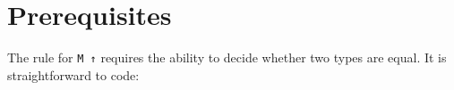 \hypertarget{prerequisites}{%
\section{Prerequisites}\label{prerequisites}}

The rule for \texttt{M\ ↑} requires the ability to decide whether two
types are equal. It is straightforward to code:

\begin{fence}
\begin{code}%
\>[0]\AgdaSpace{}%
\AgdaSymbol{:}\AgdaSpace{}%
\AgdaSymbol{(}\AgdaSpace{}%
\AgdaSpace{}%
\AgdaSymbol{:}\AgdaSpace{}%
\AgdaSymbol{)}\AgdaSpace{}%
\AgdaSpace{}%
\AgdaSpace{}%
\AgdaSymbol{(}\AgdaSpace{}%
\AgdaSpace{}%
\AgdaSymbol{)}\<%
\\
\>[0]%
\>[8]\AgdaSpace{}%
%
\>[28]\AgdaSymbol{=}%
\>[31]\AgdaSpace{}%
\<%
\\
\>[0]%
\>[8]\AgdaSpace{}%
\AgdaSymbol{(}\AgdaSpace{}%
\AgdaSpace{}%
\AgdaSymbol{)}%
\>[28]\AgdaSymbol{=}%
\>[31]\AgdaSpace{}%
\<%
\\
\>[0]\AgdaSymbol{(}\AgdaSpace{}%
\AgdaSpace{}%
\AgdaSymbol{)}\AgdaSpace{}%
\AgdaSpace{}%
%
\>[28]\AgdaSymbol{=}%
\>[31]\AgdaSpace{}%
\<%
\\
\>[0]\AgdaSymbol{(}\AgdaSpace{}%
\AgdaSpace{}%
\AgdaSymbol{)}\AgdaSpace{}%
\AgdaSpace{}%
\AgdaSymbol{(}\AgdaSpace{}%
\AgdaSpace{}%
\AgdaSymbol{)}\<%
\\
\>[0][@{}l@{\AgdaIndent{0}}]%
\>[2]\AgdaSpace{}%
\AgdaSpace{}%
\AgdaSpace{}%
\AgdaSpace{}%
\AgdaSymbol{|}\AgdaSpace{}%
\AgdaSpace{}%
\AgdaSpace{}%

\end{code}
\end{fence}
